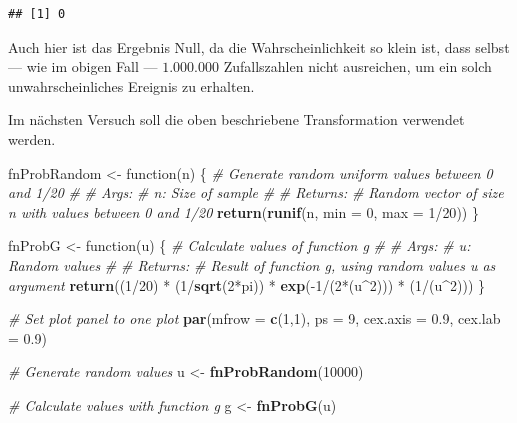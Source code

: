 \documentclass[10pt,]{article}
\newenvironment{Shaded}{\begin{snugshade}}{\end{snugshade}}
\newcommand{\KeywordTok}[1]{\textcolor[rgb]{0.13,0.29,0.53}{\textbf{{#1}}}}
\newcommand{\DataTypeTok}[1]{\textcolor[rgb]{0.13,0.29,0.53}{{#1}}}
\newcommand{\DecValTok}[1]{\textcolor[rgb]{0.00,0.00,0.81}{{#1}}}
\newcommand{\FloatTok}[1]{\textcolor[rgb]{0.00,0.00,0.81}{{#1}}}
\newcommand{\StringTok}[1]{\textcolor[rgb]{0.31,0.60,0.02}{{#1}}}
\newcommand{\CommentTok}[1]{\textcolor[rgb]{0.56,0.35,0.01}{\textit{{#1}}}}
\newcommand{\NormalTok}[1]{{#1}}
\begin{document}
\begin{verbatim}
## [1] 0
\end{verbatim}

Auch hier ist das Ergebnis Null, da die Wahrscheinlichkeit so klein ist,
dass selbst --- wie im obigen Fall --- \(1.000.000\) Zufallszahlen nicht
ausreichen, um ein solch unwahrscheinliches Ereignis zu erhalten.

Im nächsten Versuch soll die oben beschriebene Transformation verwendet
werden.

\begin{Shaded}
\begin{Highlighting}[]
\NormalTok{fnProbRandom <-}\StringTok{ }\NormalTok{function(n) \{}
  \CommentTok{# Generate random uniform values between 0 and 1/20}
  \CommentTok{# }
  \CommentTok{# Args:}
  \CommentTok{#   n: Size of sample}
  \CommentTok{#   }
  \CommentTok{# Returns:}
  \CommentTok{#   Random vector of size n with values between 0 and 1/20}
  \KeywordTok{return}\NormalTok{(}\KeywordTok{runif}\NormalTok{(n, }\DataTypeTok{min =} \DecValTok{0}\NormalTok{, }\DataTypeTok{max =} \DecValTok{1}\NormalTok{/}\DecValTok{20}\NormalTok{))}
\NormalTok{\}}

\NormalTok{fnProbG <-}\StringTok{ }\NormalTok{function(u) \{}
  \CommentTok{# Calculate values of function g}
  \CommentTok{# }
  \CommentTok{# Args:}
  \CommentTok{#   u: Random values}
  \CommentTok{#   }
  \CommentTok{# Returns:}
  \CommentTok{#   Result of function g, using random values u as argument}
  \KeywordTok{return}\NormalTok{((}\DecValTok{1}\NormalTok{/}\DecValTok{20}\NormalTok{) *}\StringTok{ }\NormalTok{(}\DecValTok{1}\NormalTok{/}\KeywordTok{sqrt}\NormalTok{(}\DecValTok{2}\NormalTok{*pi)) *}\StringTok{ }\KeywordTok{exp}\NormalTok{(-}\DecValTok{1}\NormalTok{/(}\DecValTok{2}\NormalTok{*(u^}\DecValTok{2}\NormalTok{))) *}\StringTok{ }\NormalTok{(}\DecValTok{1}\NormalTok{/(u^}\DecValTok{2}\NormalTok{)))}
\NormalTok{\}}

\CommentTok{# Set plot panel to one plot}
\KeywordTok{par}\NormalTok{(}\DataTypeTok{mfrow =} \KeywordTok{c}\NormalTok{(}\DecValTok{1}\NormalTok{,}\DecValTok{1}\NormalTok{), }\DataTypeTok{ps =} \DecValTok{9}\NormalTok{, }\DataTypeTok{cex.axis =} \FloatTok{0.9}\NormalTok{, }\DataTypeTok{cex.lab =} \FloatTok{0.9}\NormalTok{)}

\CommentTok{# Generate random values}
\NormalTok{u <-}\StringTok{ }\KeywordTok{fnProbRandom}\NormalTok{(}\DecValTok{10000}\NormalTok{)}

\CommentTok{# Calculate values with function g}
\NormalTok{g <-}\StringTok{ }\KeywordTok{fnProbG}\NormalTok{(u)}


\end{Highlighting}
\end{Shaded}
\end{document}
